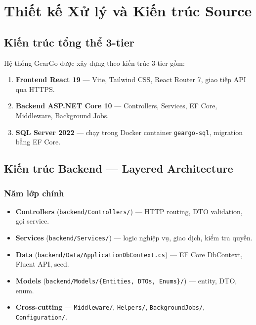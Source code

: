 \chapter{Thiết kế Xử lý và Kiến trúc Source}
\label{chuong:kien_truc}

\section{Kiến trúc tổng thể 3-tier}
\label{sec:kien_truc_tong_the}

Hệ thống GearGo được xây dựng theo kiến trúc 3-tier gồm:
\begin{enumerate}
  \item \textbf{Frontend React 19} --- Vite, Tailwind CSS, React Router 7, giao tiếp API qua HTTPS.
  \item \textbf{Backend ASP.NET Core 10} --- Controllers, Services, EF Core, Middleware, Background Jobs.
  \item \textbf{SQL Server 2022} --- chạy trong Docker container \texttt{geargo-sql}, migration bằng EF Core.
\end{enumerate}

\section{Kiến trúc Backend --- Layered Architecture}
\label{sec:backend_arch}

\subsection{Năm lớp chính}
\begin{itemize}
  \item \textbf{Controllers} (\texttt{backend/Controllers/}) --- HTTP routing, DTO validation, gọi service.
  \item \textbf{Services} (\texttt{backend/Services/}) --- logic nghiệp vụ, giao dịch, kiểm tra quyền.
  \item \textbf{Data} (\texttt{backend/Data/ApplicationDbContext.cs}) --- EF Core DbContext, Fluent API, seed.
  \item \textbf{Models} (\texttt{backend/Models/\{Entities, DTOs, Enums\}/}) --- entity, DTO, enum.
  \item \textbf{Cross-cutting} --- \texttt{Middleware/}, \texttt{Helpers/}, \texttt{BackgroundJobs/}, \texttt{Configuration/}.
\end{itemize}


